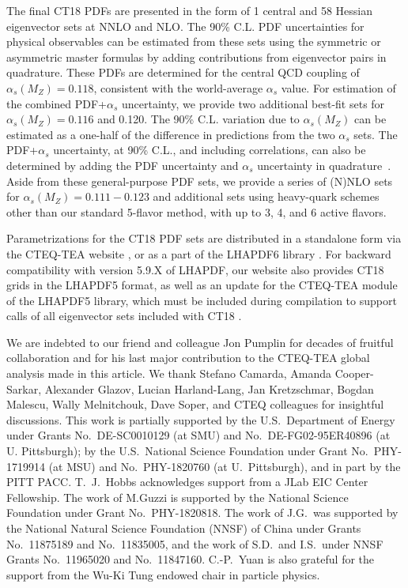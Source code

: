 The final CT18 PDFs are presented in the form of 1 central and 58
Hessian eigenvector sets at NNLO and NLO. The 90\% C.L. PDF
uncertainties for physical observables can be estimated from these
sets using the symmetric \cite{Pumplin:2002vw} or asymmetric
\cite{Lai:2010vv,Nadolsky:2001yg} master formulas by adding
contributions from eigenvector pairs in quadrature. These PDFs are
determined for the central QCD coupling of $\alpha_s(M_Z)=0.118$,
consistent with the world-average $\alpha_s$ value. For estimation of
the combined PDF+$\alpha_s$ uncertainty, we provide two additional
best-fit sets for $\alpha_s(M_Z)=0.116$ and 0.120. The
90\% C.L. variation due to $\alpha_s(M_Z)$ can be estimated as a one-half of the
difference in predictions from the two $\alpha_s$ sets. The
PDF+$\alpha_s$ uncertainty, at 90\% C.L., and including correlations,
can also be determined by adding the PDF uncertainty and $\alpha_s$
uncertainty in quadrature~\cite{Lai:2010nw}.
%
%
Aside from these general-purpose PDF sets, we provide a series of (N)NLO
sets for $\alpha_s(M_Z)=0.111-0.123$
and additional sets using heavy-quark
schemes other than our standard 5-flavor method, with up to 3, 4, and 6 active flavors. 

Parametrizations for the CT18 PDF sets are distributed in a standalone
form via the CTEQ-TEA website \cite{CT18website}, or as a part of
the LHAPDF6 library \cite{LHAPDF6}. For backward compatibility with
version 5.9.X of LHAPDF, our website also provides CT18 grids in the
LHAPDF5 format, as well as an update for the CTEQ-TEA module
of the LHAPDF5 library, which must be included during compilation
to support calls of all eigenvector sets included with CT18 \cite{LHAPDF5}.



\begin{acknowledgments}
We are indebted to our friend and colleague Jon Pumplin for decades of fruitful collaboration and for his last major contribution to the CTEQ-TEA global analysis made in this article.
We thank Stefano Camarda, Amanda Cooper-Sarkar, Alexander Glazov, Lucian Harland-Lang, Jan Kretzschmar, Bogdan Malescu, Wally Melnitchouk, Dave Soper, and CTEQ colleagues for insightful discussions. This work is partially supported by the U.S.~Department of Energy under Grants No.~DE-SC0010129 (at SMU) and No.~DE-FG02-95ER40896 (at U. Pittsburgh); by the U.S.~National Science Foundation
under Grant No.~PHY-1719914 (at MSU) and No.~PHY-1820760 (at U.~Pittsburgh), and in part by the PITT PACC. T.~J.~Hobbs acknowledges support from a JLab EIC Center Fellowship.
The work of M.Guzzi is supported by the National Science Foundation under Grant No.~PHY-1820818. The work of J.G.~was supported by the National Natural Science Foundation (NNSF)
of China under Grants No.~11875189 and No.~11835005, and the work of S.D.~and I.S.~under NNSF Grants No.~11965020 and No.~11847160. C.-P.~Yuan is also grateful for the support from
the Wu-Ki Tung endowed chair in particle physics.

\end{acknowledgments}